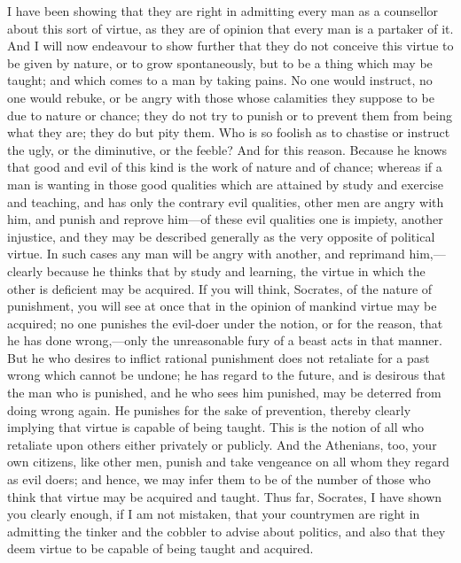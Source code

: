 \documentclass[11pt,letter]{article}
\begin{document}
\par  I have been showing that they are right in admitting every man as a counsellor about this sort of virtue, as they are of opinion that every man is a partaker of it. And I will now endeavour to show further that they do not conceive this virtue to be given by nature, or to grow spontaneously, but to be a thing which may be taught; and which comes to a man by taking pains. No one would instruct, no one would rebuke, or be angry with those whose calamities they suppose to be due to nature or chance; they do not try to punish or to prevent them from being what they are; they do but pity them. Who is so foolish as to chastise or instruct the ugly, or the diminutive, or the feeble? And for this reason. Because he knows that good and evil of this kind is the work of nature and of chance; whereas if a man is wanting in those good qualities which are attained by study and exercise and teaching, and has only the contrary evil qualities, other men are angry with him, and punish and reprove him—of these evil qualities one is impiety, another injustice, and they may be described generally as the very opposite of political virtue. In such cases any man will be angry with another, and reprimand him,—clearly because he thinks that by study and learning, the virtue in which the other is deficient may be acquired. If you will think, Socrates, of the nature of punishment, you will see at once that in the opinion of mankind virtue may be acquired; no one punishes the evil-doer under the notion, or for the reason, that he has done wrong,—only the unreasonable fury of a beast acts in that manner. But he who desires to inflict rational punishment does not retaliate for a past wrong which cannot be undone; he has regard to the future, and is desirous that the man who is punished, and he who sees him punished, may be deterred from doing wrong again. He punishes for the sake of prevention, thereby clearly implying that virtue is capable of being taught. This is the notion of all who retaliate upon others either privately or publicly. And the Athenians, too, your own citizens, like other men, punish and take vengeance on all whom they regard as evil doers; and hence, we may infer them to be of the number of those who think that virtue may be acquired and taught. Thus far, Socrates, I have shown you clearly enough, if I am not mistaken, that your countrymen are right in admitting the tinker and the cobbler to advise about politics, and also that they deem virtue to be capable of being taught and acquired.
\end{document}
